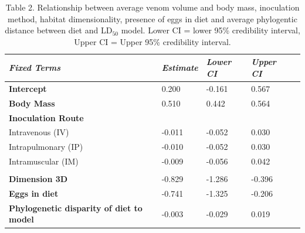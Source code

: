 \begin{table}[H]
  \centering
    \caption[ ]{Table 2. Relationship between average venom volume and body mass, inoculation method, habitat dimensionality, presence of eggs in diet and average phylogentic distance between diet and LD$_{50}$ model. Lower CI = lower 95\% credibility interval, Upper CI = Upper 95\% credibility interval.}
\begin{tabular}{*5l}    \toprule
\emph{Fixed Terms} & \emph{Estimate} & \emph{Lower CI} & \emph{Upper CI}\\\midrule
\textbf{Intercept} & 0.200  &  -0.161 & 0.567 \\ 
\textbf{Body Mass} & 0.510  & 0.442 & 0.564 \\ 
\textbf{Inoculation Route} &  &  &  \\ 
 Intravenous (IV) &  -0.011 &  -0.052 & 0.030 \\
 Intrapulmonary (IP) &  -0.010 &  -0.052 & 0.030 \\ 
 Intramuscular (IM) &  -0.009 &  -0.056 & 0.042 \\
  &  &  &  \\ 
\textbf{Dimension 3D} &  -0.829 &  -1.286 &  -0.396 \\ 
\textbf{Eggs in diet} &  -0.741 &  -1.325 &  -0.206 \\ 
\textbf{Phylogenetic disparity of diet to model} &  -0.003 &  -0.029 & 0.019 \\\bottomrule
 \hline
\end{tabular}
  \label{tbl:Table 2.}
\end{table}



